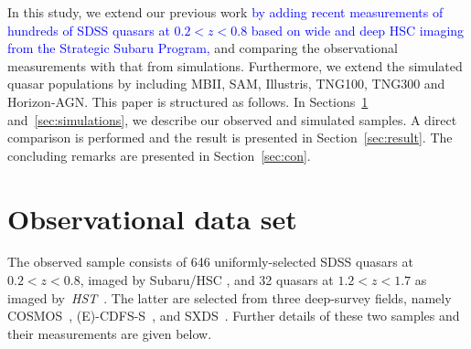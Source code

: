 \documentclass[twocolumn]{aastex631}
\newcommand{\blue}[1]{\textcolor{blue}{#1}}
\def\smass{{$M_*$}}
\def\mbh{$\mathcal M_{\rm BH}$}
\def\hst{{\it HST}}
\begin{document}
In this study, we extend our previous work \blue{by adding recent measurements of hundreds of SDSS quasars at $0.2<z<0.8$ based on wide and deep HSC imaging from the Strategic Subaru Program,} and comparing the observational measurements with that from simulations. Furthermore, we extend the simulated quasar populations by including MBII, SAM, Illustris, TNG100, TNG300 and Horizon-AGN. This paper is structured as follows. In Sections~\ref{sec:observations} and~\ref{sec:simulations}, we describe our observed and simulated samples. A direct comparison is performed and the result is presented in Section~\ref{sec:result}. The concluding remarks are presented in Section~\ref{sec:con}.


\section{Observational data set}
\label{sec:observations}
The observed sample consists of 646 uniformly-selected SDSS quasars at $0.2<z<0.8$, imaged by Subaru/HSC \citep{Li2021a}, and 32 quasars at $1.2<z<1.7$ as imaged by~\hst~\citep[][hereafter D20]{Ding2020}. The latter are selected from three deep-survey fields, namely COSMOS~\citep{Civano2016}, (E)-CDFS-S~\citep{Lehmer2005, Xue2011}, and SXDS~\citep{Ueda2008}. Further details of these two samples and their measurements are given below. 
\end{document}
